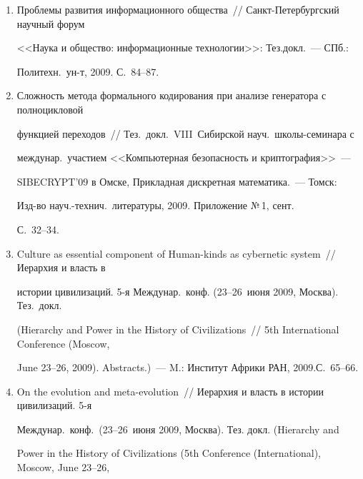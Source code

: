 \begin{enumerate}[1.]
\item {}


Проблемы развития информационного общества~// Санкт-Петербургский научный форум 


<<Наука и общество: информационные технологии>>: Тез.\linebreak докл.~--- СПб.:  


Политехн.\ ун-т, 2009. С.~84--87.





\item {}


Сложность метода формального кодирования при анализе генератора с полноцикловой 


функцией переходов~// Тез.\ докл.\ VIII~Сибирской науч.\ шко\-лы-се\-ми\-на\-ра с 


междунар.\ участием <<Компьютерная безопасность и криптография>>~--- 


SIBECRYPT'09 в Омске, Прикладная дискретная математика.~--- Томск: 


Изд-во науч.-технич.\ литературы, 2009. Приложение №\,1, сент. 


С.~32--34.





\item {}


Culture as essential component of Human-\linebreak kinds as cybernetic system~// Иерархия и власть в 


истории цивилизаций. 5-я Междунар.\ конф. (23--26~июня 2009, Москва). Тез.\ докл.\ 


(Hierarchy and Power in the History of Civilizations~// 5th International Conference (Moscow, 


June 23--26, 2009). Abstracts.)~--- M.: Институт Африки РАН, 2009.\linebreak С.~65--66.





\item {}


On the evolution and meta-evolution~// Иерархия и власть в истории цивилизаций. 5-я 


Междунар.\ конф.\ (23--26~июня 2009, Москва). Тез. докл. (Hierarchy and 


Power in the History of Civilizations (5th  Conference (International), Moscow, June 23--26, 



\end{enumerate}
